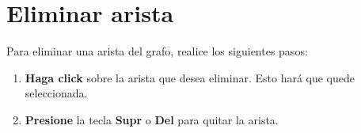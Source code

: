 \documentclass{book}
\begin{document}
\section{Eliminar arista}

Para eliminar una arista del grafo, realice los siguientes pasos:
\medskip

\begin{enumerate}
	\itemsep=8pt \topsep=0pt \partopsep=0pt \parskip=0pt \parsep=0pt

	\item \textbf{Haga click} sobre la arista que desea eliminar. Esto hará que quede seleccionada.

	\item \textbf{Presione} la tecla \textbf{Supr} o \textbf{Del} para quitar la arista.

\end{enumerate}
\medskip
\end{document}
